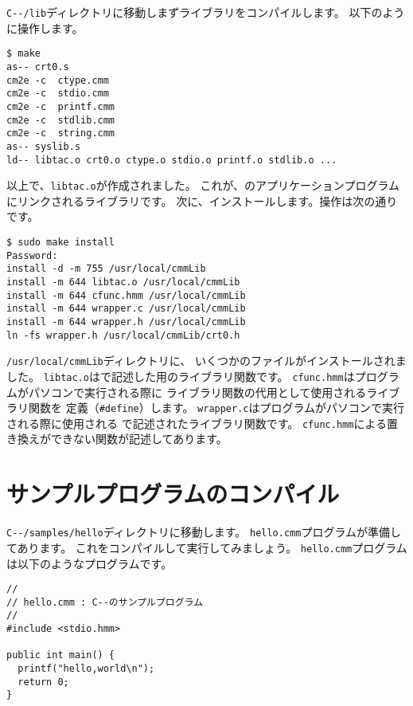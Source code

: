 \verb;C--/lib;ディレクトリに移動しまずライブラリをコンパイルします。
以下のように操作します。

\begin{mylist}
\begin{verbatim}
$ make
as-- crt0.s
cm2e -c  ctype.cmm
cm2e -c  stdio.cmm
cm2e -c  printf.cmm
cm2e -c  stdlib.cmm
cm2e -c  string.cmm
as-- syslib.s
ld-- libtac.o crt0.o ctype.o stdio.o printf.o stdlib.o ...
\end{verbatim}
\end{mylist}

以上で、\verb;libtac.o;が作成されました。
これが、{\tacos}のアプリケーションプログラムにリンクされるライブラリです。
次に、インストールします。操作は次の通りです。

\begin{mylist}
\begin{verbatim}
$ sudo make install
Password:
install -d -m 755 /usr/local/cmmLib
install -m 644 libtac.o /usr/local/cmmLib
install -m 644 cfunc.hmm /usr/local/cmmLib
install -m 644 wrapper.c /usr/local/cmmLib
install -m 644 wrapper.h /usr/local/cmmLib
ln -fs wrapper.h /usr/local/cmmLib/crt0.h
\end{verbatim}
\end{mylist}

\verb;/usr/local/cmmLib;ディレクトリに、
いくつかのファイルがインストールされました。
\verb;libtac.o;は{\cmml}で記述した{\tacos}用のライブラリ関数です。
\verb;cfunc.hmm;は{\cmm}プログラムがパソコンで実行される際に
{\cmml}ライブラリ関数の代用として使用される{\cl}ライブラリ関数を
定義（\verb;#define;）します。
\verb;wrapper.c;は{\cmm}プログラムがパソコンで実行される際に使用される
{\cl}で記述された{\cmm}ライブラリ関数です。
\verb;cfunc.hmm;による置き換えができない関数が記述してあります。

\section{サンプルプログラムのコンパイル}

\verb;C--/samples/hello;ディレクトリに移動します。
{\tt hello.cmm}プログラムが準備してあります。
これをコンパイルして実行してみましょう。
{\tt hello.cmm}プログラムは以下のような{\cmml}プログラムです。

\begin{mylist}
\begin{verbatim}
//
// hello.cmm : C--のサンプルプログラム
//
#include <stdio.hmm>

public int main() {
  printf("hello,world\n");
  return 0;
}
\end{verbatim}
\end{mylist}

